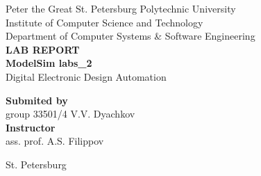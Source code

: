 \begin{titlepage}
\begin{center}
	Peter the Great St. Petersburg Polytechnic University\\[0.3cm]
	Institute of Computer Science and Technology\\[0.3cm]
	Department of Computer Systems \& Software Engineering\\[4.5cm]
	
	\textbf{LAB REPORT}\\[0.5cm]
	\textbf{ModelSim labs\_2}\\[0.1cm]
	Digital Electronic Design Automation\\[4.5cm]
\end{center}

\begin{flushright}
	\begin{minipage}{0.4\textwidth}
		\textbf{Submited by}\\[3mm]
		group 33501/4 \hspace*{3mm} V.V. Dyachkov\\[5mm]
		\textbf{Instructor}\\[5mm]
		\sign[1.8cm] \hspace*{0mm} ass. prof. A.S. Filippov\\[5mm]
	\end{minipage}
\end{flushright}

\vfill

\begin{center}
	St. Petersburg\\
	\the\year
\end{center}
\end{titlepage}

\addtocounter{page}{1}
